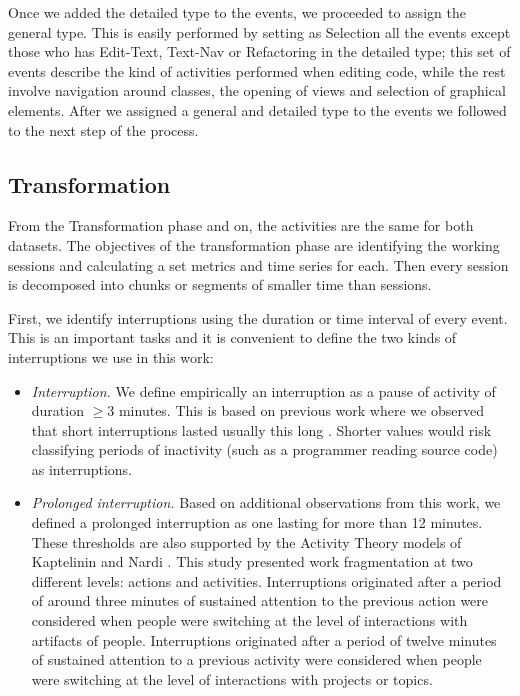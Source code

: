 Once we added the detailed type to the events, we proceeded to assign the general type. This is easily performed by setting as Selection all the events except those who has Edit-Text, Text-Nav or Refactoring in the detailed type; this set of events describe the kind of activities performed when editing code, while the rest involve navigation around classes, the opening of views and selection of graphical elements. After we assigned a general and detailed type to the events we followed to the next step of the process.

\subsection{Transformation}
From the Transformation phase and on, the activities are the same for both datasets. The objectives of the transformation phase are identifying the working sessions and calculating a set metrics and time series for each. Then every session is decomposed into chunks or segments of smaller time than sessions.

First, we identify interruptions using the duration or time interval of every event. This is an important tasks and it is convenient to define the two kinds of interruptions we use in this work:

\begin{itemize}
	\item \textit{Interruption.} We define empirically an interruption as a pause of activity of duration $\geq 3$ minutes. This is based on previous work where we observed that short interruptions lasted usually this long \cite{GM04}. Shorter values would risk classifying periods of inactivity (such as a programmer reading source code) as interruptions.
	
	\item \textit{Prolonged interruption.} Based on additional observations from this work, we defined a prolonged interruption as one lasting for more than 12 minutes. These thresholds are also supported by the Activity Theory models of Kaptelinin and Nardi \cite{KaptelininN07}. This study presented work fragmentation at two different levels: actions and activities. Interruptions originated after a period of around three minutes of sustained attention to the previous action were considered when people were switching at the level of interactions with artifacts of people. Interruptions originated after a period of twelve minutes of sustained attention to a previous activity were considered when people were switching at the level of interactions with projects or topics.  
\end{itemize}

